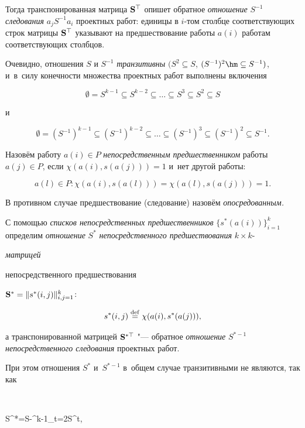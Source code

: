 Тогда транспонированная матрица ${\bf S}^\top$ опишет обратное {\em отношение} $S^{-1}$ {\em следования} $a_{j}S^{-1}a_{i}$ проектных работ: единицы в $i$-том столбце соответствующих строк матрицы ${\bf S}^\top$ указывают на предшествование работы $a(i)$ работам соответствующих столбцов. 

Очевидно, отношения $S$ и $S^{-1}$ {\em транзитивны} $(S^{2}\subseteq S$, $(S^{-1})^{2} \hm\subseteq S^{-1})$, и~в~силу конечности множества проектных работ выполнены включения

$$

\emptyset =S^{k-1}\subseteq S^{k-2}\subseteq \dots \subseteq S^{3}\subseteq S^{2}\subseteq S

$$

и

$$

\emptyset =(S^{-1})^{k-1}\subseteq (S^{-1})^{k-2}\subseteq \dots \subseteq (S^{-1})^{3}\subseteq (S^{-1})^{2}\subseteq S^{-1}.

$$



Назовём работу $a(i)\in P$ {\em непосредственным предшественником} работы $a(j)\in P$, если $\chi(a(i),s(a(j)))=1$ и~нет другой работы:

$$

a(l)\in P: \chi(a(i),s(a(l)))=\chi(a(l),s(a(j)))=1.

$$

В противном случае предшествование (следование) назовём {\em опосредованным.}



С помощью {\em списков непосредственных предшественников} $\{s^{*}(a(i))\}^{k}_{i=1}$ определим {\em отношение} $S^{*}$ {\em непосредственного предшествования} $k{\times} k$-{\em матри\-цей

непосредственного предшествования} ${\bf S^{*}}= \|

s^{*}(i,j)\|^{k}_{i, j=1}$:

$$

s^{*}(i,j)\stackrel{\rm def}{=}\chi (a(i),s^{*}(a(j))),

$$

а транспонированной матрицей ${\bf S}^{*\top}$ "--- обратное {\em отношение} $S^{*-1}$ {\em непосредственного следования} проектных работ. 

При этом отношения $S^{*}$ и~$S^{*-1}$ в~общем случае транзитивными не являются, так как

$$

S^{*}=S-\bigcup^{k-1}_{t=2}S^{t}, \quad 

